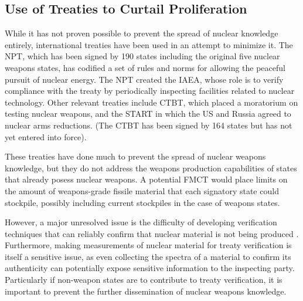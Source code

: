 \subsection{Use of Treaties to Curtail Proliferation}

While it has not proven possible to prevent the spread of nuclear knowledge entirely, international treaties have been used in an attempt to minimize it.  The \gls{NPT}, which has been signed by 190 states including the original five nuclear weapons states, has codified a set of rules and norms for allowing the peaceful pursuit of nuclear energy\cite{_treaty_????}.  The \gls{NPT} created the \gls{IAEA}, whose role is to verify compliance with the treaty by periodically inspecting facilities related to nuclear technology.  Other relevant treaties include \gls{CTBT}, which placed a moratorium on testing nuclear weapons, and the \gls{START} in which the \gls{US} and Russia agreed to nuclear arms reductions. (The \gls{CTBT} has been signed by 164 states but has not yet entered into force).

These treaties have done much to prevent the spread of nuclear weapons knowledge, but they do not address the weapons production capabilities of states that already posess nuclear weapons.
A potential \gls{FMCT} would place limits on the amount of weapons-grade fissile material that each signatory state could stockpile, possibly including current stockpiles in the case of weapons states.

However, a major unresolved issue is the difficulty of developing verification techniques that can reliably confirm that nuclear material is not being produced \cite{_fissile_2013}.  Furthermore, making measurements of nuclear material for treaty verification is itself a sensitive issue, as even collecting the spectra of a material to confirm its authenticity can potentially expose sensitive information to the inspecting party\cite{glaser_zero-knowledge_2014}. Particularly if non-weapon states are to contribute to treaty verification, it is important to prevent the further dissemination of nuclear weapons knowledge.

